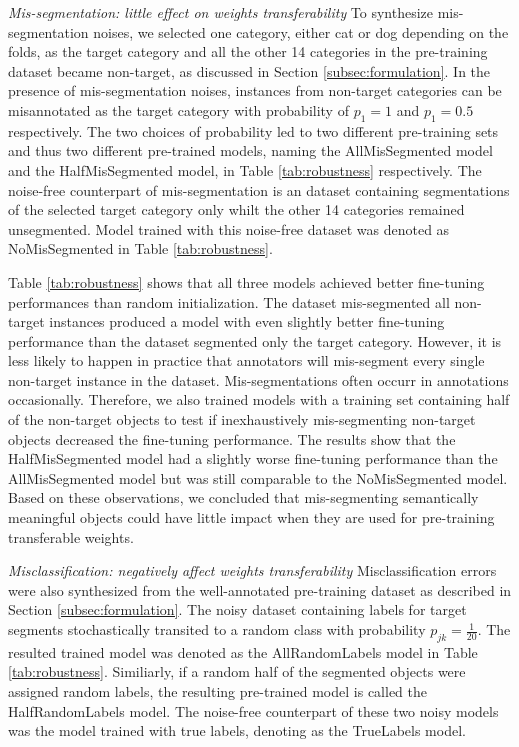 \noindent \textit{Mis-segmentation: little effect on weights transferability}
\noindent
To synthesize mis-segmentation noises, we selected one category, either cat or dog depending on the folds, as the target category and all the other 14 categories in the pre-training dataset became non-target, as discussed in Section \ref{subsec:formulation}.
In the presence of mis-segmentation noises, instances from non-target categories can be misannotated as the target category with probability of $p_{1} = 1$ and $p_{1}= 0.5$ respectively.
The two choices of probability led to two different pre-training sets and thus two different pre-trained models, naming the AllMisSegmented model and the HalfMisSegmented model, in Table \ref{tab:robustness} respectively.
The noise-free counterpart of mis-segmentation is an dataset containing segmentations of the selected target category only whilt the other 14 categories remained unsegmented.
Model trained with this noise-free dataset was denoted as NoMisSegmented in Table \ref{tab:robustness}.

\noindent
Table \ref{tab:robustness} shows that all three models achieved better fine-tuning performances than random initialization.
The dataset mis-segmented all non-target instances produced a model with even slightly better fine-tuning performance than the dataset segmented only the target category.
However, it is less likely to happen in practice that annotators will mis-segment every single non-target instance in the dataset.
Mis-segmentations often occurr in annotations occasionally.
Therefore, we also trained models with a training set containing half of the non-target objects to test if inexhaustively mis-segmenting non-target objects decreased the fine-tuning performance.
The results show that the HalfMisSegmented model had a slightly worse fine-tuning performance than the AllMisSegmented model but was still comparable to the NoMisSegmented model.
Based on these observations, we concluded that mis-segmenting semantically meaningful objects could have little impact when they are used for pre-training transferable weights.

\noindent \textit{Misclassification: negatively affect weights transferability}
\noindent
Misclassification errors were also synthesized from the well-annotated pre-training dataset as described in Section \ref{subsec:formulation}.
The noisy dataset containing labels for target segments stochastically transited to a random class with probability $p_{jk}=\frac{1}{20}$.
The resulted trained model was denoted as the AllRandomLabels model in Table \ref{tab:robustness}.
Similiarly, if a random half of the segmented objects were assigned random labels, the resulting pre-trained model is called the HalfRandomLabels model.
The noise-free counterpart of these two noisy models was the model trained with true labels, denoting as the TrueLabels model.

